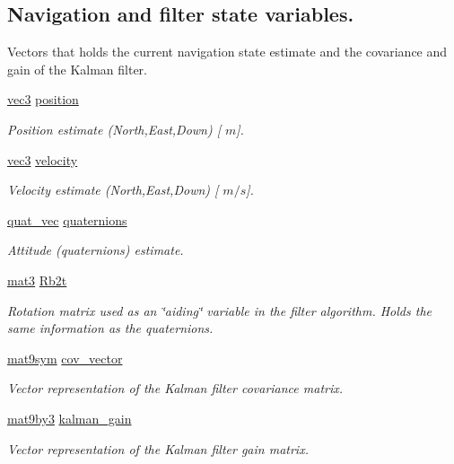 \subsection*{\-Navigation and filter state variables.}
\label{_amgrp0f8fa76f99fe991372a251de33492bc0}%
 \-Vectors that holds the current navigation state estimate and the covariance and gain of the \-Kalman filter. \begin{DoxyCompactItemize}
\item 
\hyperlink{nav__types_8h_a90c683614d896321009d3b3c401b764f}{vec3} \hyperlink{group__nav__eq_ga2807b9fb4b79e01dfde022b613d2575f}{position}
\begin{DoxyCompactList}\small\item\em \-Position estimate (\-North,\-East,\-Down) \mbox{[} $m$\mbox{]}. \end{DoxyCompactList}\item 
\hyperlink{nav__types_8h_a90c683614d896321009d3b3c401b764f}{vec3} \hyperlink{group__nav__eq_ga589efe00d8bd4e8a69613f98390a04c7}{velocity}
\begin{DoxyCompactList}\small\item\em \-Velocity estimate (\-North,\-East,\-Down) \mbox{[} $m/s$\mbox{]}. \end{DoxyCompactList}\item 
\hyperlink{nav__types_8h_ad9a64f455fa02affaba6740746aae7b2}{quat\-\_\-vec} \hyperlink{group__nav__eq_ga059b83d370e7e6a5e9728a8f91943051}{quaternions}
\begin{DoxyCompactList}\small\item\em \-Attitude (quaternions) estimate. \end{DoxyCompactList}\item 
\hyperlink{nav__types_8h_ab7675278cb555aa98b43c97694753329}{mat3} \hyperlink{group__nav__eq_ga42753cbc9ae76483da3cbc331a011586}{\-Rb2t}
\begin{DoxyCompactList}\small\item\em \-Rotation matrix used as an \char`\"{}aiding\char`\"{} variable in the filter algorithm. \-Holds the same information as the quaternions. \end{DoxyCompactList}\item 
\hyperlink{nav__types_8h_a0f4089eb3ad75e0675d7f7d3914fddeb}{mat9sym} \hyperlink{group__nav__eq_ga74c09cdfc5b901e7f842dbe42ed8f4f4}{cov\-\_\-vector}
\begin{DoxyCompactList}\small\item\em \-Vector representation of the \-Kalman filter covariance matrix. \end{DoxyCompactList}\item 
\hyperlink{nav__types_8h_af1d09a15760e21f5de26f0839f1b6c62}{mat9by3} \hyperlink{group__nav__eq_gac1df051c6f380aa8d1598b15ee9e6eca}{kalman\-\_\-gain}
\begin{DoxyCompactList}\small\item\em \-Vector representation of the \-Kalman filter gain matrix. \end{DoxyCompactList}\end{DoxyCompactItemize}
